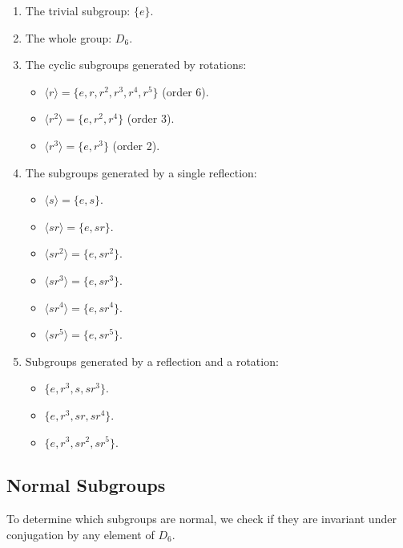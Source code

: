 \documentclass[12pt]{amsart}
\theoremstyle{definition}
\numberwithin{equation}{section}
\begin{document}
\begin{exercise}{2}
    \begin{enumerate}[label=\arabic*.]
        \item The trivial subgroup: \(\{e\}\).
        \item The whole group: \(D_6\).
        \item The cyclic subgroups generated by rotations:
            \begin{itemize}[label=--]
                \item \(\langle r \rangle = \{e, r, r^2, r^3, r^4, r^5\}\) (order 6).
                \item \(\langle r^2 \rangle = \{e, r^2, r^4\}\) (order 3).
                \item \(\langle r^3 \rangle = \{e, r^3\}\) (order 2).
            \end{itemize}
        \item The subgroups generated by a single reflection:
            \begin{itemize}[label=--]
                \item \(\langle s \rangle = \{e, s\}\).
                \item \(\langle sr \rangle = \{e, sr\}\).
                \item \(\langle sr^2 \rangle = \{e, sr^2\}\).
                \item \(\langle sr^3 \rangle = \{e, sr^3\}\).
                \item \(\langle sr^4 \rangle = \{e, sr^4\}\).
                \item \(\langle sr^5 \rangle = \{e, sr^5\}\).
            \end{itemize}
        \item Subgroups generated by a reflection and a rotation:
            \begin{itemize}[label=--]
                \item \(\{e, r^3, s, sr^3\}\).
                \item \(\{e, r^3, sr, sr^4\}\).
                \item \(\{e, r^3, sr^2, sr^5\}\).
            \end{itemize}
    \end{enumerate}

    \subsection*{Normal Subgroups}

    To determine which subgroups are normal, we check if they are invariant under conjugation by any element of \(D_6\).


\end{exercise}
\end{document}
